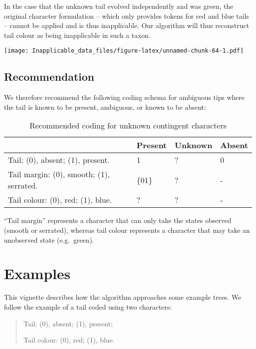 \documentclass[]{book}
\theoremstyle{definition}
\theoremstyle{definition}
\theoremstyle{definition}
\theoremstyle{remark}
\begin{document}
In the case that the unknown tail evolved independently and was green,
the original character formulation -- which only provides tokens for red
and blue tails -- cannot be applied and is thus inapplicable. Our
algorithm will thus reconstruct tail colour as being inapplicable in
such a taxon.

\texttt{[image: Inapplicable\_data\_files/figure-latex/unnamed-chunk-64-1.pdf]}

\hypertarget{recommendation}{%
\section{Recommendation}\label{recommendation}}

We therefore recommend the following coding schema for ambiguous tips
where the tail is known to be present, ambiguous, or known to be absent:

\begin{table}

\caption{\label{tab:unnamed-chunk-65}Recommended coding for unknown contingent characters}
\centering
\begin{tabular}[t]{l|l|l|l}
\hline
  & Present & Unknown & Absent\\
\hline
Tail: (0), absent; (1), present. & 1 & ? & 0\\
\hline
Tail margin: (0), smooth; (1), serrated. & \{01\} & ? & -\\
\hline
Tail colour: (0), red; (1), blue. & ? & ? & -\\
\hline
\end{tabular}
\end{table}

``Tail margin'' represents a character that can only take the states
observed (smooth or serrated), whereas tail colour represents a
character that may take an unobserved state (e.g.~green).

\hypertarget{examples}{%
\chapter{Examples}\label{examples}}

This vignette describes how the algorithm approaches some example trees.
We follow the example of a tail coded using two characters:

\begin{quote}
Tail: (0), absent; (1), present;

Tail colour: (0), red; (1), blue.
\end{quote}
\end{document}
